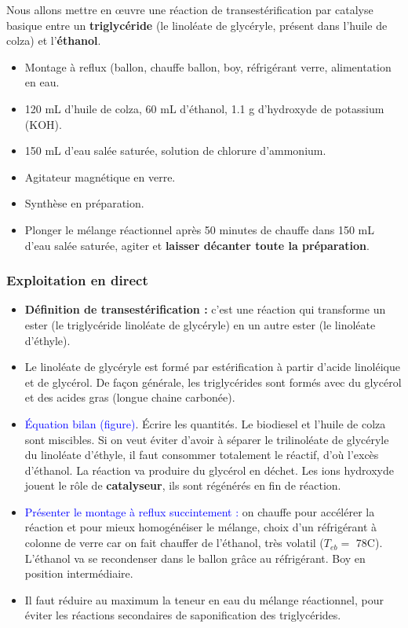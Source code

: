 \documentclass[11pt,a4paper]{report}
\begin{document}
Nous allons mettre en œuvre une réaction de transestérification par catalyse basique entre un \textbf{triglycéride} (le linoléate de glycéryle, présent dans l'huile de colza) et l'\textbf{éthanol}.

\begin{itemize}
	\item Montage à reflux (ballon, chauffe ballon, boy, réfrigérant verre, alimentation en eau.
	\item 120 mL d'huile de colza, 60 mL d'éthanol, 1.1 g d'hydroxyde de potassium (KOH).
	\item 150 mL d'eau salée saturée, solution de chlorure d'ammonium.
	\item Agitateur magnétique en verre.
	\item Synthèse en préparation.
	\item Plonger le mélange réactionnel après 50 minutes de chauffe dans 150 mL d'eau salée saturée, 			agiter et \textbf{laisser décanter toute la préparation}.
\end{itemize}

	\subsubsection{Exploitation en direct}
	\begin{itemize}
		\item \textbf{Définition de transestérification :} c'est une réaction qui transforme un ester 				(le triglycéride linoléate de glycéryle) en un autre ester (le linoléate d'éthyle).
		\item Le linoléate de glycéryle est formé par estérification à partir d'acide linoléique et de 				glycérol. De façon générale, les triglycérides sont formés avec du glycérol et des acides 				gras (longue chaine carbonée).
		\item \textcolor{blue}{Équation bilan (figure)}. Écrire les quantités. Le biodiesel et l'huile 				de colza sont miscibles. Si on veut éviter d'avoir à séparer le trilinoléate de glycéryle 				du linoléate d'éthyle, il faut consommer totalement le réactif, d'où l'excès d'éthanol.
			La réaction va produire du glycérol en déchet. Les ions hydroxyde jouent le rôle de 					\textbf{catalyseur}, ils sont régénérés en fin de réaction.
		\item \textcolor{blue}{Présenter le montage à reflux succintement :} on chauffe pour accélérer 				la réaction et pour mieux homogénéiser le mélange, choix d'un réfrigérant à colonne de 					verre car on fait chauffer de l'éthanol, très volatil ($T_{eb} =$ 78\degree C). L'éthanol 				va se recondenser dans le ballon grâce au réfrigérant. Boy en position intermédiaire.
		\item Il faut réduire au maximum la teneur en eau du mélange réactionnel, pour éviter les 					réactions secondaires de saponification des triglycérides.
	\end{itemize}
\end{document}
